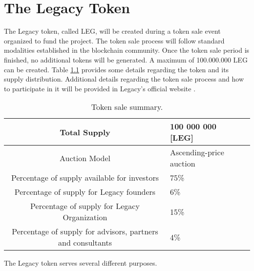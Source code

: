 \chapter{The Legacy Token} %
\label{cha:the_legacy_token}


The Legacy token, called LEG, will be created during a token sale event organized to fund the project. The token sale process will follow standard modalities established in the blockchain community. Once the token sale period is finished, no additional tokens will be generated. A maximum of 100.000.000 LEG can be created. 
Table \ref{table:ico_summary} provides some details regarding the token and its supply distribution. Additional details regarding the token sale process and how to participate in it will be provided in Legacy's official website \cite{Legacy}.

\begin{table}[h]
	\begin{center}		
		{\renewcommand{\arraystretch}{1.3}			
			\begin{tabular}{| c | p{5cm} | p{3.5cm}  |}	
		    \hline	
		    	Total Supply		&  100 000 000 [LEG]  \\ \hline
		    	Auction Model       &  Ascending-price auction \\ \hline														
				Percentage of supply available for investors & 75\% \\ \hline
				Percentage of supply for Legacy founders     &  6\% \\ \hline
				Percentage of supply for Legacy Organization & 15\% \\ \hline
				Percentage of supply for advisors, partners and consultants & 4\% \\
			\hline	
			\end{tabular}				
		}
	\caption{Token sale summary.}
	\label{table:ico_summary}		
	\end{center}
\end{table}



The Legacy token serves several different purposes. 


